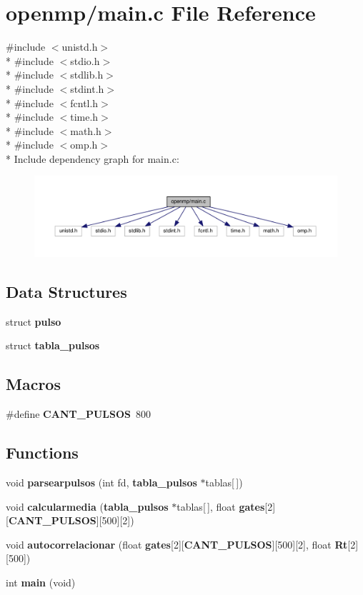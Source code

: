 \section{openmp/main.c File Reference}
\label{openmp_2main_8c}
{\ttfamily \#include $<$unistd.\+h$>$}\\*
{\ttfamily \#include $<$stdio.\+h$>$}\\*
{\ttfamily \#include $<$stdlib.\+h$>$}\\*
{\ttfamily \#include $<$stdint.\+h$>$}\\*
{\ttfamily \#include $<$fcntl.\+h$>$}\\*
{\ttfamily \#include $<$time.\+h$>$}\\*
{\ttfamily \#include $<$math.\+h$>$}\\*
{\ttfamily \#include $<$omp.\+h$>$}\\*
Include dependency graph for main.\+c\+:
\nopagebreak
\begin{figure}[H]
\begin{center}
\leavevmode
\includegraphics[width=350pt]{openmp_2main_8c__incl}
\end{center}
\end{figure}
\subsection*{Data Structures}
\begin{DoxyCompactItemize}
\item 
struct {\bf pulso}
\item 
struct {\bf tabla\+\_\+pulsos}
\end{DoxyCompactItemize}
\subsection*{Macros}
\begin{DoxyCompactItemize}
\item 
\#define {\bf C\+A\+N\+T\+\_\+\+P\+U\+L\+S\+OS}~800
\end{DoxyCompactItemize}
\subsection*{Functions}
\begin{DoxyCompactItemize}
\item 
void {\bf parsearpulsos} (int fd, {\bf tabla\+\_\+pulsos} $\ast$tablas[$\,$])
\item 
void {\bf calcularmedia} ({\bf tabla\+\_\+pulsos} $\ast$tablas[$\,$], float {\bf gates}[2][{\bf C\+A\+N\+T\+\_\+\+P\+U\+L\+S\+OS}][500][2])
\item 
void {\bf autocorrelacionar} (float {\bf gates}[2][{\bf C\+A\+N\+T\+\_\+\+P\+U\+L\+S\+OS}][500][2], float {\bf Rt}[2][500])
\item 
int {\bf main} (void)
\end{DoxyCompactItemize}


